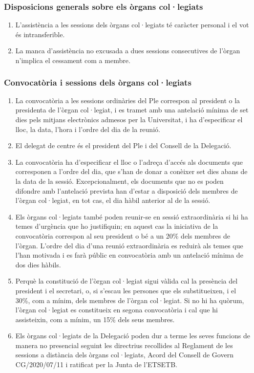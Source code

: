 \documentclass[a4paper,12pt]{article}
\renewcommand*{\thesubsubsection}{\arabic{subsubsection}}
\begin{document}
\subsubsection{Disposicions generals sobre els òrgans col·legiats}
\begin{enumerate}[\thesubsubsection.1]
	\item L'assistència a les sessions dels òrgans col·legiats té caràcter personal i el vot és intransferible.
	\item La manca d'assistència no excusada a dues sessions consecutives de l'òrgan n'implica el cessament com a membre.
\end{enumerate}

\subsubsection{Convocatòria i sessions dels òrgans col·legiats}\label{art:convocatories}
\begin{enumerate}[\thesubsubsection.1]
	\item La convocatòria a les sessions ordinàries del Ple correspon al president o la presidenta de l'òrgan col·legiat, i es tramet amb una antelació mínima de set dies pels mitjans electrònics admesos per la Universitat, i ha d'especificar el lloc, la data, l'hora i l'ordre del dia de la reunió.
	\item El delegat de centre és el president del Ple i del Consell de la Delegació.
	\item La convocatòria ha d'especificar el lloc o l'adreça d'accés als documents que corresponen a l'ordre del dia, que s'han de donar a conèixer set dies abans de la data de la sessió. Excepcionalment, els documents que no es poden difondre amb l'antelació prevista han d'estar a disposició dels membres de l'òrgan col·legiat, en tot cas, el dia hàbil anterior al de la sessió.
	\item Els òrgans col·legiats també poden reunir-se en sessió extraordinària si hi ha temes d'urgència que ho justifiquin; en aquest cas la iniciativa de la convocatòria correspon al seu president o bé a un 20\% dels membres de l'òrgan.\label{art:extraordinaries}
	L'ordre del dia d'una reunió extraordinària es reduirà als temes que l'han motivada i es farà públic en convocatòria amb un antelació mínima de dos dies hàbils.
	\item Perquè la constitució de l'òrgan col·legiat sigui vàlida cal la presència del president i el secretari, o, si s'escau les persones que els substitueixen, i el 30\%, com a mínim, dels membres de l'òrgan col·legiat. Si no hi ha quòrum, l'òrgan col·legiat es constitueix en segona convocatòria i cal que hi assisteixin, com a mínim, un 15\% dels seus membres.\label{art:constitucio}
	\item Els òrgans col·legiats de la Delegació poden dur a terme les seves funcions de manera no presencial seguint les directrius recollides al Reglament de les sessions a distància dels òrgans col·legiats, Acord del Consell de Govern CG/2020/07/11 i ratificat per la Junta de l'ETSETB.
\end{enumerate}
\end{document}
